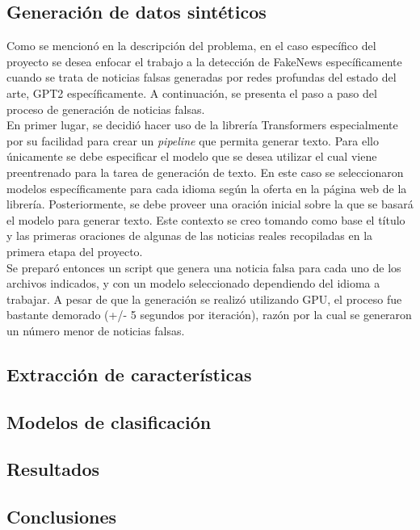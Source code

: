 \subsection{Generación de datos sintéticos}
Como se mencionó en la descripción del problema, en el caso específico del proyecto se desea enfocar el trabajo a la detección de FakeNews específicamente cuando se trata de noticias falsas generadas por redes profundas del estado del arte, GPT2 específicamente. A continuación, se presenta el paso a paso del proceso de generación de noticias falsas.\\

En primer lugar, se decidió hacer uso de la librería Transformers especialmente por su facilidad para crear un \textit{pipeline} que permita generar texto. Para ello únicamente se debe especificar el modelo que se desea utilizar el cual viene preentrenado para la tarea de generación de texto. En este caso se seleccionaron modelos específicamente para cada idioma según la oferta en la página web de la librería. Posteriormente, se debe proveer una oración inicial sobre la que se basará el modelo para generar texto. Este contexto se creo tomando como base el título y las primeras oraciones de algunas de las noticias reales recopiladas en la primera etapa del proyecto. \\

Se preparó entonces un script que genera una noticia falsa para cada uno de los archivos indicados, y con un modelo seleccionado dependiendo del idioma a trabajar. A pesar de que la generación se realizó utilizando GPU, el proceso fue bastante demorado (+/- 5 segundos por iteración), razón por la cual se generaron un número menor de noticias falsas.

\subsection{Extracción de características}


\subsection{Modelos de clasificación}


\subsection{Resultados}


\subsection{Conclusiones}

